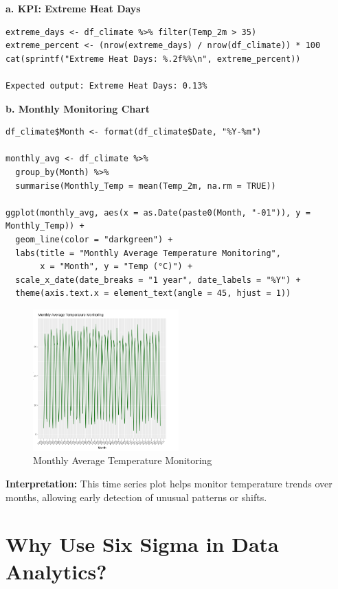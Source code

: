 \textbf{a. KPI: Extreme Heat Days}
\begin{verbatim}
extreme_days <- df_climate %>% filter(Temp_2m > 35)
extreme_percent <- (nrow(extreme_days) / nrow(df_climate)) * 100
cat(sprintf("Extreme Heat Days: %.2f%%\n", extreme_percent))

Expected output: Extreme Heat Days: 0.13%
\end{verbatim}

\textbf{b. Monthly Monitoring Chart}

\begin{verbatim}
df_climate$Month <- format(df_climate$Date, "%Y-%m")

monthly_avg <- df_climate %>%
  group_by(Month) %>%
  summarise(Monthly_Temp = mean(Temp_2m, na.rm = TRUE))

ggplot(monthly_avg, aes(x = as.Date(paste0(Month, "-01")), y = Monthly_Temp)) +
  geom_line(color = "darkgreen") +
  labs(title = "Monthly Average Temperature Monitoring",
       x = "Month", y = "Temp (°C)") +
  scale_x_date(date_breaks = "1 year", date_labels = "%Y") +
  theme(axis.text.x = element_text(angle = 45, hjust = 1))
\end{verbatim}

\begin{figure}[h]
\centering
\includegraphics[width=0.5\textwidth]{figures/monitoring_chart.png}
\caption{Monthly Average Temperature Monitoring}
\end{figure}

\textbf{Interpretation:} This time series plot helps monitor temperature trends over months, allowing early detection of unusual patterns or shifts.

\section{Why Use Six Sigma in Data Analytics?}

